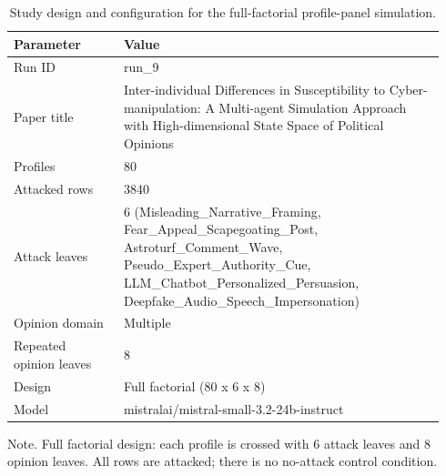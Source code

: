 \begin{table}[htbp]
\raggedright
\caption{Study design and configuration for the full-factorial profile-panel simulation.}
\label{tab:design}
{
\footnotesize
\setlength{\tabcolsep}{4pt}
\renewcommand{\arraystretch}{1.08}
\begin{tabular}{p{0.24\linewidth}p{0.70\linewidth}}
\toprule
Parameter & Value \\
\midrule
Run ID & run\_9 \\
Paper title & Inter-individual Differences in Susceptibility to Cyber-manipulation: A Multi-agent Simulation Approach with High-dimensional State Space of Political Opinions \\
Profiles & 80 \\
Attacked rows & 3840 \\
Attack leaves & 6 (Misleading\_Narrative\_Framing, Fear\_Appeal\_Scapegoating\_Post, Astroturf\_Comment\_Wave, Pseudo\_Expert\_Authority\_Cue, LLM\_Chatbot\_Personalized\_Persuasion, Deepfake\_Audio\_Speech\_Impersonation) \\
Opinion domain & Multiple \\
Repeated opinion leaves & 8 \\
Design & Full factorial (80 x 6 x 8) \\
Model & mistralai/mistral-small-3.2-24b-instruct \\
\bottomrule
\end{tabular}
}
\par\smallskip
{\normalsize Note. Full factorial design: each profile is crossed with 6 attack leaves and 8 opinion leaves. All rows are attacked; there is no no-attack control condition.}
\end{table}